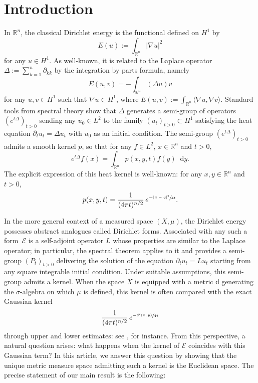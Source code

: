 \documentclass[JEP,XML,SOM,Unicode,published]{cedram}
\theoremstyle{plain}
\theoremstyle{definition}
\newcommand{\setR}{\mathbb{R}}
\newcommand{\cE}{\mathcal{E}}
\newcommand{\di}{\mathop{}\!\mathrm{d}}
\newcommand{\dist}{\mathsf{d}}
\begin{document}
\maketitle
\tableofcontents


\section{Introduction}

In $\setR^n$, the classical Dirichlet energy is the functional defined on $H^1$ by
\[
E(u):= \int_{\setR^n} |\nabla u|^2
\]
for any $u \in H^1$. As well-known, it is related to the Laplace operator $\Delta:=\sum_{k=1}^{n}\partial_{kk}$ by the integration by parts formula, namely
\[
E(u,v)=-\int_{\setR^n} (\Delta u) v
\]
for any $u,v \in H^1$ such that $\nabla u\in H^1$, where $E(u,v):=\int_{\setR^n} \langle \nabla u, \nabla v\rangle$. Standard tools from spectral theory show that $\Delta$ generates a semi-group of operators $(e^{t\Delta})_{t>0}$ sending any $u_0 \in L^2$ to the family $(u_t)_{t>0}\subset H^1$ satisfying the heat equation $\partial_t u_t = \Delta u_t$ with $u_0$ as an initial condition. The semi-group $(e^{t\Delta})_{t>0}$ admits a smooth kernel $p$, so that for any $f \in L^2$, $x \in \setR^n$ and $t>0$,
\[
e^{t\Delta} f(x) = \int_{\setR^n} p(x,y,t)f(y) \di y.
\]
The explicit expression of this heat kernel is well-known: for any $x,y \in \setR^n$ and $t>0$,
\[
p(x,y,t) = \frac{1}{(4 \pi t)^{n/2}}\, e^{-\sfrac{|x-y|^2}{4t}}.
\]

In the more general context of a measured space $(X,\mu)$, the Dirichlet energy possesses abstract analogues called Dirichlet forms. Associated with any such a form~$\cE$ is a self-adjoint operator $L$ whose properties are similar to the Laplace operator; in particular, the spectral theorem applies to it and provides a semi-group $(P_t)_{t>0}$ delivering the solution of the equation $\partial_t u_t = L u_t$ starting from any square integrable initial condition. Under suitable assumptions, this semi-group admits a kernel. When the space $X$ is equipped with a metric $\dist$ generating the $\sigma$-algebra on which $\mu$ is defined, this kernel is often compared with the exact Gaussian kernel
\[
\frac{1}{(4 \pi t)^{n/2}}\, e^{-\sfrac{\dist^2(x,y)}{4t}}
\]
through upper and lower estimates: see \cite{Sturm2}, for instance. From this perspective, a natural question arises: what happens when the kernel of $\cE$ coincides with this Gaussian term? In this article, we answer this question by showing that the unique metric measure space admitting such a kernel is the Euclidean space. The precise statement of our main result is the following:
\end{document}
